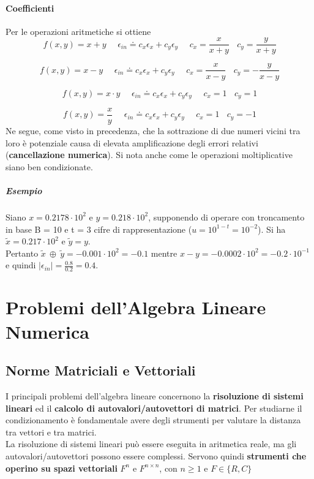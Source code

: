 \documentclass[10pt]{book}
\begin{document}
\subsubsection{Coefficienti}
Per le operazioni aritmetiche si ottiene
$$f(x, y) = x + y\:\:\:\:\:\:\epsilon_{in} \doteq c_x\epsilon_x + c_y\epsilon_y\:\:\:\:\:\:c_x=\frac{x}{x + y}\:\:\:\:c_y = \frac{y}{x + y}$$

$$f(x, y) = x - y\:\:\:\:\:\:\epsilon_{in} \doteq c_x\epsilon_x + c_y\epsilon_y\:\:\:\:\:\:c_x=\frac{x}{x - y}\:\:\:\:c_y = -\frac{y}{x - y}$$

$$f(x, y) = x \cdot y\:\:\:\:\:\:\epsilon_{in} \doteq c_x\epsilon_x + c_y\epsilon_y\:\:\:\:\:\:c_x= 1\:\:\:\:c_y = 1$$

$$f(x, y) = \frac{x}{y}\:\:\:\:\:\:\epsilon_{in} \doteq c_x\epsilon_x + c_y\epsilon_y\:\:\:\:\:\:c_x= 1\:\:\:\:c_y = -1$$
Ne segue, come visto in precedenza, che la sottrazione di due numeri vicini tra loro è potenziale causa di elevata amplificazione degli errori relativi (\textbf{cancellazione numerica}). Si nota anche come le operazioni moltiplicative siano ben condizionate.
\paragraph{Esempio} Siano $x = 0.2178\cdot10^2$ e $y = 0.218\cdot10^2$, supponendo di operare con troncamento in base B = 10 e t = 3 cifre di rappresentazione ($u = 10^{1 - t} = 10^{-2}$). Si ha $\tilde{x} = 0.217\cdot10^2$ e $\tilde{y} = y$.\\
Pertanto $\tilde{x}\:\oplus\:\tilde{y} = -0.001\cdot10^2 = -0.1$ mentre $x - y = -0.0002\cdot10^2 = -0.2\cdot10^{-1}$ e quindi $|\epsilon_{in}| = \frac{0.8}{0.2} = 0.4$.
\chapter{Problemi dell'Algebra Lineare Numerica}
\section{Norme Matriciali e Vettoriali}
I principali problemi dell'algebra lineare concernono la \textbf{risoluzione di sistemi lineari} ed il \textbf{calcolo di autovalori/autovettori di matrici}. Per studiarne il condizionamento è fondamentale avere degli strumenti per valutare la distanza tra vettori e tra matrici.\\
La risoluzione di sistemi lineari può essere eseguita in aritmetica reale, ma gli autovalori/autovettori possono essere complessi. Servono quindi \textbf{strumenti che operino su spazi vettoriali} $F^n$ e $F^{n \times n}$, con $n \geq 1$ e $F \in \{R, C\}$
\end{document}
